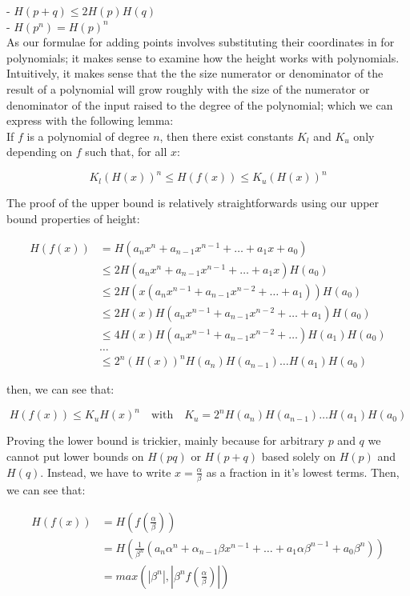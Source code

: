\documentclass{article}
\begin{document}
- $H(p + q) \leq 2H(p)H(q)$\\

- $H(p^n) = H(p)^n$\\

As our formulae for adding points involves substituting their coordinates in for polynomials; it makes sense to examine how the height works with polynomials. Intuitively, it makes sense that the the size numerator or denominator of the result of a polynomial will grow roughly with the size of the numerator or denominator of the input raised to the degree of the polynomial; which we can express with the following lemma:\\

If $f$ is a polynomial of degree $n$, then there exist constants $K_l$ and $K_u$ only depending on $f$ such that, for all $x$:

\[ K_l (H(x))^n \leq H(f(x)) \leq K_u (H(x))^n \]

The proof of the upper bound is relatively straightforwards using our upper bound properties of height:

\begin{align*} 
H(f(x)) &= H(a_n x^n + a_{n-1}x^{n-1} + \dots + a_1 x + a_0)\\
&\leq 2H(a_n x^n + a_{n-1}x^{n-1} + \dots + a_1 x)H(a_0)\\
&\leq 2H(x(a_n x^{n-1} + a_{n-1}x^{n-2} + \dots + a_1))H(a_0)\\
&\leq 2H(x)H(a_n x^{n-1} + a_{n-1}x^{n-2} + \dots + a_1)H(a_0)\\
&\leq 4H(x)H(a_n x^{n-1} + a_{n-1}x^{n-2} + \dots)H(a_1)H(a_0)\\
&\dots\\
&\leq 2^n (H(x))^n H(a_n)H(a_{n-1})\dots H(a_1)H(a_0)
\end{align*} 

then, we can see that:

\[ H(f(x)) \leq K_u H(x)^n \quad \text{with} \quad K_u = 2^n H(a_n)H(a_{n-1})\dots H(a_1)H(a_0) \]

Proving the lower bound is trickier, mainly because for arbitrary $p$ and $q$ we cannot put lower bounds on $H(pq)$ or $H(p + q)$ based solely on $H(p)$ and $H(q)$. Instead, we have to write $x = \frac{\alpha}{\beta}$ as a fraction in it's lowest terms. Then, we can see that:

\begin{align*}
    H(f(x)) &= H(f(\frac{\alpha}{\beta}))\\
            &= H(\frac{1}{\beta^n}(a_n \alpha^n + \alpha_{n-1} \beta x^{n-1} + \dots + a_1 \alpha \beta^{n-1} + a_0 \beta^n))\\
            &= max(|\beta^n|, |\beta^n f(\frac{\alpha}{\beta})|)\
\end{align*}
\end{document}
